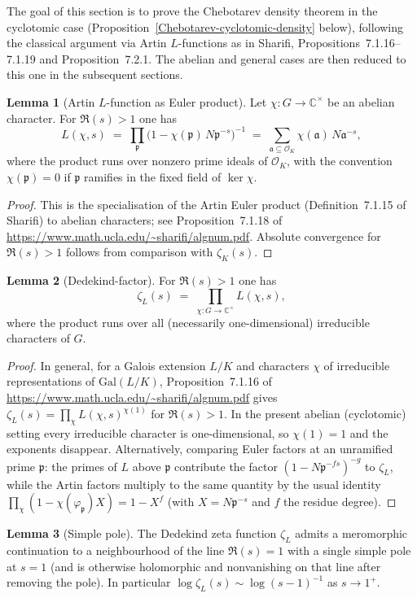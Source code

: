 \documentclass[10pt,a4paper]{article}
\newcommand{\uses}[1]{}
\theoremstyle{definition}
\newtheorem{lemma}{Lemma}[section]
\begin{document}
The goal of this section is to prove the Chebotarev density theorem in the cyclotomic case
(Proposition~\ref{Chebotarev-cyclotomic-density} below), following the classical argument via
Artin $L$-functions as in Sharifi, Propositions~7.1.16--7.1.19 and Proposition~7.2.1.  The
abelian and general cases are then reduced to this one in the subsequent sections.
\begin{lemma}[Artin $L$-function as Euler product]\label{Artin-L-euler}
Let $\chi : G \to \mathbb{C}^\times$ be an abelian character.  For $\Re(s) > 1$ one has
\[
L(\chi,s) \;=\; \prod_{\mathfrak{p}} \bigl(1 - \chi(\mathfrak{p})\, N\mathfrak{p}^{-s}\bigr)^{-1}
\;=\; \sum_{\mathfrak{a} \subseteq \mathcal{O}_K} \chi(\mathfrak{a})\, N\mathfrak{a}^{-s},
\]
where the product runs over nonzero prime ideals of $\mathcal{O}_K$, with the convention
$\chi(\mathfrak{p}) = 0$ if $\mathfrak{p}$ ramifies in the fixed field of $\ker\chi$.
\end{lemma}
\begin{proof}
This is the specialisation of the Artin Euler product (Definition~7.1.15 of Sharifi) to
abelian characters; see Proposition~7.1.18 of
\url{https://www.math.ucla.edu/~sharifi/algnum.pdf}.  Absolute convergence for $\Re(s)>1$
follows from comparison with $\zeta_K(s)$.
\end{proof}
\begin{lemma}[Dedekind-factor]\label{Dedekind-factor}
For $\Re(s) > 1$ one has
\[
\zeta_L(s) \;=\; \prod_{\chi : G \to \mathbb{C}^\times} L(\chi,s),
\]
where the product runs over all (necessarily one-dimensional) irreducible characters of $G$.
\end{lemma}
\begin{proof}\uses{Artin-L-euler}
In general, for a Galois extension $L/K$ and characters $\chi$ of irreducible representations of
$\mathrm{Gal}(L/K)$, Proposition~7.1.16 of
\url{https://www.math.ucla.edu/~sharifi/algnum.pdf} gives
$\zeta_L(s) = \prod_\chi L(\chi,s)^{\chi(1)}$ for $\Re(s)>1$.  In the present abelian
(cyclotomic) setting every irreducible character is one-dimensional, so $\chi(1)=1$ and the
exponents disappear.  Alternatively, comparing Euler factors at an unramified prime
$\mathfrak{p}$: the primes of $L$ above $\mathfrak{p}$ contribute the factor
$(1 - N\mathfrak{p}^{-fs})^{-g}$ to $\zeta_L$, while the Artin factors multiply to the same
quantity by the usual identity $\prod_\chi (1 - \chi(\varphi_{\mathfrak{p}}) X) = 1 - X^f$
(with $X = N\mathfrak{p}^{-s}$ and $f$ the residue degree).
\end{proof}
\begin{lemma}[Simple pole]\label{Dedekind-pole}
The Dedekind zeta function $\zeta_L$ admits a meromorphic continuation to a neighbourhood of
the line $\Re(s)=1$ with a single simple pole at $s=1$ (and is otherwise holomorphic and
nonvanishing on that line after removing the pole).  In particular
$\log \zeta_L(s) \sim \log(s-1)^{-1}$ as $s \to 1^+$.
\end{lemma}
\end{document}
